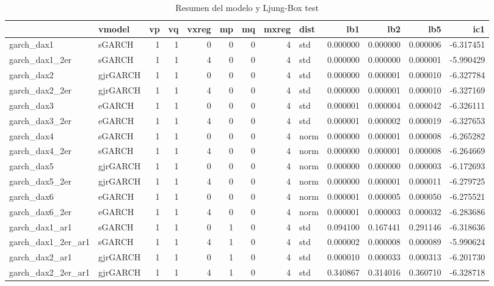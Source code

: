 \documentclass[
  11pt,
]{article}
\begin{document}
\begin{table}

\caption{\label{tab:unnamed-chunk-56}Resumen del modelo y Ljung-Box test}
\centering
\fontsize{12}{14}\selectfont
\begin{tabular}[t]{llrrrrrrlrrrr}
\toprule
  & vmodel & vp & vq & vxreg & mp & mq & mxreg & dist & lb1 & lb2 & lb5 & ic1\\
\midrule
garch\_dax1 & sGARCH & 1 & 1 & 0 & 0 & 0 & 4 & std & 0.000000 & 0.000000 & 0.000006 & -6.317451\\
garch\_dax1\_2er & sGARCH & 1 & 1 & 4 & 0 & 0 & 4 & std & 0.000000 & 0.000000 & 0.000001 & -5.990429\\
garch\_dax2 & gjrGARCH & 1 & 1 & 0 & 0 & 0 & 4 & std & 0.000000 & 0.000001 & 0.000010 & -6.327784\\
garch\_dax2\_2er & gjrGARCH & 1 & 1 & 4 & 0 & 0 & 4 & std & 0.000000 & 0.000001 & 0.000010 & -6.327169\\
garch\_dax3 & eGARCH & 1 & 1 & 0 & 0 & 0 & 4 & std & 0.000001 & 0.000004 & 0.000042 & -6.326111\\
\addlinespace
garch\_dax3\_2er & eGARCH & 1 & 1 & 4 & 0 & 0 & 4 & std & 0.000001 & 0.000002 & 0.000019 & -6.327653\\
garch\_dax4 & sGARCH & 1 & 1 & 0 & 0 & 0 & 4 & norm & 0.000000 & 0.000001 & 0.000008 & -6.265282\\
garch\_dax4\_2er & sGARCH & 1 & 1 & 4 & 0 & 0 & 4 & norm & 0.000000 & 0.000001 & 0.000008 & -6.264669\\
garch\_dax5 & gjrGARCH & 1 & 1 & 0 & 0 & 0 & 4 & norm & 0.000000 & 0.000000 & 0.000003 & -6.172693\\
garch\_dax5\_2er & gjrGARCH & 1 & 1 & 4 & 0 & 0 & 4 & norm & 0.000000 & 0.000001 & 0.000011 & -6.279725\\
\addlinespace
garch\_dax6 & eGARCH & 1 & 1 & 0 & 0 & 0 & 4 & norm & 0.000001 & 0.000005 & 0.000050 & -6.275521\\
garch\_dax6\_2er & eGARCH & 1 & 1 & 4 & 0 & 0 & 4 & norm & 0.000001 & 0.000003 & 0.000032 & -6.283686\\
garch\_dax1\_ar1 & sGARCH & 1 & 1 & 0 & 1 & 0 & 4 & std & 0.094100 & 0.167441 & 0.291146 & -6.318636\\
garch\_dax1\_2er\_ar1 & sGARCH & 1 & 1 & 4 & 1 & 0 & 4 & std & 0.000002 & 0.000008 & 0.000089 & -5.990624\\
garch\_dax2\_ar1 & gjrGARCH & 1 & 1 & 0 & 1 & 0 & 4 & std & 0.000010 & 0.000033 & 0.000313 & -6.201730\\
\addlinespace
garch\_dax2\_2er\_ar1 & gjrGARCH & 1 & 1 & 4 & 1 & 0 & 4 & std & 0.340867 & 0.314016 & 0.360710 & -6.328718\\

\end{tabular}
\end{table}
\end{document}
